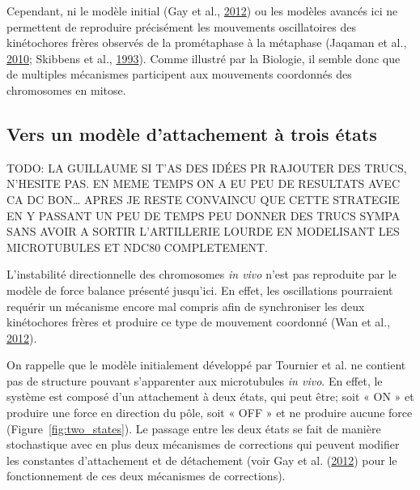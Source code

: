 \documentclass[12pt,a4paper,twoside,openright]{book}
\begin{document}
Cependant, ni le modèle initial (Gay et al.,
\hyperref[ref-Gay2012a]{2012}) ou les modèles avancés ici ne permettent
de reproduire précisément les mouvements oscillatoires des kinétochores
frères observés de la prométaphase à la métaphase (Jaqaman et al.,
\hyperref[ref-Jaqaman2010]{2010}; Skibbens et al.,
\hyperref[ref-Skibbens1993]{1993}). Comme illustré par la Biologie, il
semble donc que de multiples mécanismes participent aux mouvements
coordonnés des chromosomes en mitose.

\subsection{Vers un modèle d'attachement à trois
états}\label{vers-un-moduxe8le-dattachement-uxe0-trois-uxe9tats}

TODO: LA GUILLAUME SI T'AS DES IDÉES PR RAJOUTER DES TRUCS, N'HESITE
PAS. EN MEME TEMPS ON A EU PEU DE RESULTATS AVEC CA DC BON\ldots{} APRES
JE RESTE CONVAINCU QUE CETTE STRATEGIE EN Y PASSANT UN PEU DE TEMPS PEU
DONNER DES TRUCS SYMPA SANS AVOIR A SORTIR L'ARTILLERIE LOURDE EN
MODELISANT LES MICROTUBULES ET NDC80 COMPLETEMENT.

L'instabilité directionnelle des chromosomes \emph{in vivo} n'est pas
reproduite par le modèle de force balance présenté jusqu'ici. En effet,
les oscillations pourraient requérir un mécanisme encore mal compris
afin de synchroniser les deux kinétochores frères et produire ce type de
mouvement coordonné (Wan et al., \hyperref[ref-Wan2012]{2012}).

On rappelle que le modèle initialement développé par Tournier et al. ne
contient pas de structure pouvant s'apparenter aux microtubules \emph{in
vivo}. En effet, le système est composé d'un attachement à deux états,
qui peut être; soit « ON » et produire une force en direction du pôle,
soit « OFF » et ne produire aucune force (Figure~\ref{fig:two_states}).
Le passage entre les deux états se fait de manière stochastique avec en
plus deux mécanismes de corrections qui peuvent modifier les constantes
d'attachement et de détachement (voir Gay et al.
(\hyperref[ref-Gay2012a]{2012}) pour le fonctionnement de ces deux
mécanismes de corrections).
\end{document}

